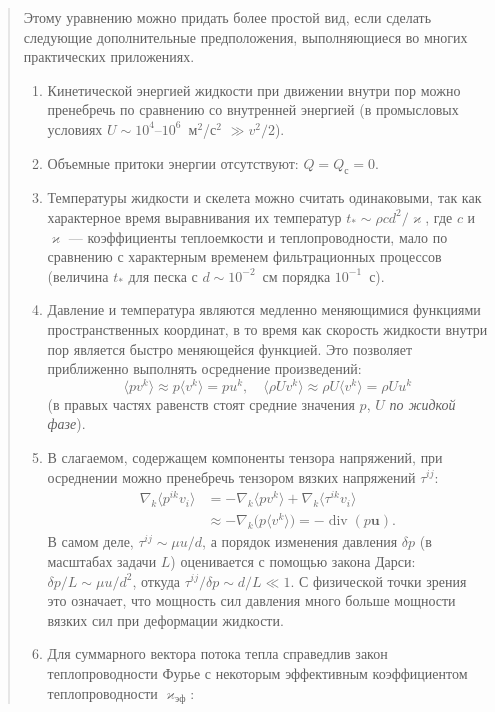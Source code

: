 \documentclass[12pt,a4paper]{article}
\DeclareMathOperator{\Div}{div}
\newenvironment{textquote}{\begin{quote}\sloppy}{\end{quote}}
\begin{document}
\begin{textquote}
Этому уравнению можно придать более простой вид, если сделать следующие дополнительные предположения, выполняющиеся во многих практических приложениях.
\begin{enumerate}\sloppy
\item[а)] Кинетической энергией жидкости при движении внутри пор можно пренебречь по сравнению со внутренней энергией (в промысловых условиях $U\sim10^4$--$10^6$~м$^2$/с$^2$ $\gg v^2/2$).
\item[б)] Объемные притоки энергии отсутствуют: $Q=Q_{\text{с}}=0$.
\item[в)] Температуры жидкости и скелета можно считать одинаковыми, так как характерное время выравнивания их температур $t_*\sim\rho cd^2/\varkappa$, где $c$ и $\varkappa$ --- коэффициенты теплоемкости и теплопроводности, мало по сравнению с характерным временем фильтрационных процессов (величина $t_*$ для песка с $d\sim10^{-2}$~см порядка $10^{-1}$~с).
\item[г)] Давление и температура являются медленно меняющимися функциями пространственных координат, в то время как скорость жидкости внутри пор является быстро меняющейся функцией. Это позволяет приближенно выполнять осреднение произведений:
\[
\langle pv^k\rangle\approx p\langle v^k\rangle=pu^k,\quad
\langle\rho Uv^k\rangle\approx\rho U\langle v^k\rangle=\rho Uu^k
\]
(в правых частях равенств стоят средние значения $p$, $U$ \textit{по жидкой фазе}).
\item[д)] В слагаемом, содержащем компоненты тензора напряжений, при осреднении можно пренебречь тензором вязких напряжений $\tau^{ij}$:
\[
\begin{aligned}
\nabla_k\langle p^{ik}v_i\rangle
&=-\nabla_k\langle pv^k\rangle+\nabla_k\langle\tau^{ik}v_i\rangle\\
&\approx-\nabla_k\bigl(p\langle v^k\rangle\bigr)=-\Div(p\boldsymbol{u}).
\end{aligned}
\]
В самом деле, $\tau^{ij}\sim\mu u/d$, а порядок изменения давления $\delta p$ (в масштабах задачи $L$) оценивается с помощью закона Дарси: $\delta p/L\sim\mu u/d^2$, откуда $\tau^{ij}/\delta p\sim d/L\ll1$. С физической точки зрения это означает, что мощность сил давления много больше мощности вязких сил при деформации жидкости.
\item[е)] Для суммарного вектора потока тепла справедлив закон теплопроводности Фурье с некоторым эффективным коэффициентом теплопроводности $\varkappa_{\text{эф}}$:
\begin{equation}

\end{equation}
\end{enumerate}
\end{textquote}
\end{document}
